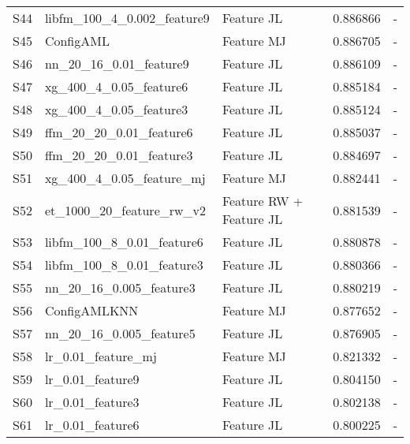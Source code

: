 \begin{table*}[t]
\begin{center}
\begin{tabular}{lllll}
S44	& libfm\_100\_4\_0.002\_feature9	& Feature JL							& 0.886866	& - \\
S45	& ConfigAML			& Feature MJ									& 0.886705	& - \\
S46	& nn\_20\_16\_0.01\_feature9	& Feature JL								& 0.886109	& - \\
S47 	& xg\_400\_4\_0.05\_feature6	& Feature JL								& 0.885184	& - \\
S48 	& xg\_400\_4\_0.05\_feature3	& Feature JL								& 0.885124	& - \\
S49 	& ffm\_20\_20\_0.01\_feature6	& Feature JL								& 0.885037	& - \\
S50	& ffm\_20\_20\_0.01\_feature3	& Feature JL								& 0.884697	& - \\
S51 	& xg\_400\_4\_0.05\_feature\_mj	& Feature MJ							& 0.882441	& - \\
S52	& et\_1000\_20\_feature\_rw\_v2	& Feature RW + Feature JL				& 0.881539	& - \\
S53	& libfm\_100\_8\_0.01\_feature6	& Feature JL							& 0.880878	& - \\
S54	& libfm\_100\_8\_0.01\_feature3	& Feature JL							& 0.880366	& - \\
S55	& nn\_20\_16\_0.005\_feature3	& Feature JL								& 0.880219	& - \\
S56	& ConfigAMLKNN		& Feature MJ									& 0.877652	& - \\
S57	& nn\_20\_16\_0.005\_feature5	& Feature JL								& 0.876905	& - \\
S58	& lr\_0.01\_feature\_mj		& Feature MJ								& 0.821332	& - \\
S59	& lr\_0.01\_feature9		& Feature JL									& 0.804150	& - \\
S60	& lr\_0.01\_feature3		& Feature JL									& 0.802138	& - \\
S61	& lr\_0.01\_feature6		& Feature JL									& 0.800225	& - \\
\end{tabular}
\end{center}
\end{table*}